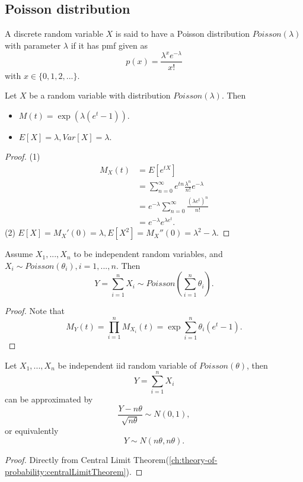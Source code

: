 \begin{refsection}
\subsection{Poisson distribution}
\begin{definition}
	A discrete random variable $X$ is said to have a Poisson distribution $Poisson(\lambda)$ with parameter $\lambda$ if it has pmf given as
	$$p(x) = \frac{\lambda^xe^{-\lambda}}{x!}$$
	with $x\in \{0,1,2,...\}$.	
\end{definition}


\begin{lemma}\cite[154]{hoggintroduction}\label{ch:theory-of-statistics:th:PoissonBasicproperty}
Let $X$ be a random variable with distribution $Poisson(\lambda)$. Then
\begin{itemize}
	\item $M(t) = \exp(\lambda(e^t - 1))$.
	\item $E[X] = \lambda, Var[X] = \lambda.$
\end{itemize}
\end{lemma}
\begin{proof}
(1)
\begin{align*}
M_X(t) &= E[e^{tX}] \\
&= \sum_{n=0}^{\infty} e^{tn}\frac{\lambda^n}{n!}e^{-\lambda}\\
&= e^{-\lambda}\sum_{n=0}^{\infty} \frac{(\lambda e^t)^n}{n!}\\
&= e^{-\lambda}e^{\lambda e^t}.
\end{align*}
(2) $E[X] = M_X'(0) = \lambda, E[X^2] = M_X''(0) = \lambda^2-\lambda$.
\end{proof}


\begin{lemma}\label{ch:theory-of-statistics:th:sumofPoisson}
Assume $X_1,...,X_n$ to be independent random variables, and $X_i \sim Poisson(\theta_i),i=1,...,n$. Then $$Y = \sum_{i=1}^n X_i \sim Poisson(\sum_{i=1}^n \theta_i).$$
\end{lemma}
\begin{proof}
Note that $$M_Y(t) = \prod_{i=1}^n M_{X_i}(t) = \exp{\sum_{i=1}^n \theta_i(e^t - 1)}.$$
\end{proof}

\begin{lemma}
Let $X_1,...,X_n$ be independent iid random variable of $Poisson(\theta)$, then
$$Y = \sum_{i=1}^n X_i$$
can be approximated by $$\frac{Y - n\theta}{\sqrt{n\theta}}\sim N(0,1),$$
or equivalently
$$Y \sim N(n\theta,n\theta).$$
\end{lemma}
\begin{proof}
Directly from Central Limit Theorem(\autoref{ch:theory-of-probability:centralLimitTheorem}).
\end{proof}


\end{refsection}

